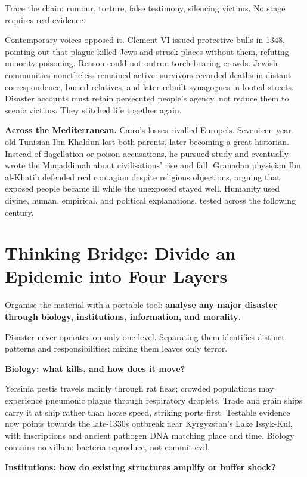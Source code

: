 Trace the chain: rumour, torture, false testimony, silencing victims. No stage requires real evidence.

Contemporary voices opposed it. Clement VI issued protective bulls in 1348, pointing out that plague killed Jews and struck places without them, refuting minority poisoning. Reason could not outrun torch-bearing crowds. Jewish communities nonetheless remained active: survivors recorded deaths in distant correspondence, buried relatives, and later rebuilt synagogues in looted streets. Disaster accounts must retain persecuted people's agency, not reduce them to scenic victims. They stitched life together again.

\textbf{Across the Mediterranean.} Cairo's losses rivalled Europe's. Seventeen-year-old Tunisian Ibn Khaldun lost both parents, later becoming a great historian. Instead of flagellation or poison accusations, he pursued study and eventually wrote the Muqaddimah about civilisations' rise and fall. Granadan physician Ibn al-Khatib defended real contagion despite religious objections, arguing that exposed people became ill while the unexposed stayed well. Humanity used divine, human, empirical, and political explanations, tested across the following century.

\section[Thinking Bridge: Four Disaster Layers]{Thinking Bridge: Divide an Epidemic into Four Layers}
Organise the material with a portable tool: \textbf{analyse any major disaster through biology, institutions, information, and morality}.

Disaster never operates on only one level. Separating them identifies distinct patterns and responsibilities; mixing them leaves only terror.

\textbf{Biology: what kills, and how does it move?}

Yersinia pestis travels mainly through rat fleas; crowded populations may experience pneumonic plague through respiratory droplets. Trade and grain ships carry it at ship rather than horse speed, striking ports first. Testable evidence now points towards the late-1330s outbreak near Kyrgyzstan's Lake Issyk-Kul, with inscriptions and ancient pathogen DNA matching place and time. Biology contains no villain: bacteria reproduce, not commit evil.

\textbf{Institutions: how do existing structures amplify or buffer shock?}

